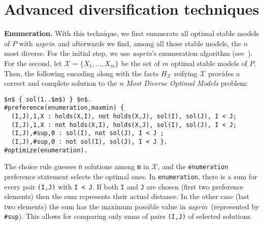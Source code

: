 \documentclass[a4paper,UKenglish]{oasics}
\newcommand{\sysfont}{\textit}
\newcommand{\asprin}{\sysfont{asprin}}
\newcommand{\mysubsection}[2]{\smallskip\noindent\textbf{#1.}}
\begin{document}
%
%
%
%
%
%
%
%
%
%
%
%
%
%
%
%
%
%
%
%
%
%
%
%
%
%
%
%
%
%
%
%
%
%
%
%
%
%
%
%
%
%
%
%
%
%
%
%
%
%
%
%
%
%
%
%
%
%
%
%
%
%
%
%
%
%
%
%
%
%
%
%
%
%
%
%
%
%
%
%
%
%
%
%
%
%
%
%
%
%
%
%
%
%
%
%
%
%
%
%
%
%

\section{Advanced diversification techniques}\label{sec:advanced}
%
\makeatletter{}%

%
%
\mysubsection{Enumeration}{sec:enumeration}
%
With this technique, we first enumerate all optimal stable models of $P$ with \asprin\
and afterwards we find, among all those stable models, the $n$ most diverse.
%
%
%
For the initial step, we use \asprin{}'s enumeration algorithm (see~\cite{brderosc15a}).
For the second, let $\mathcal{X}=\{ X_1, \ldots, X_m \}$ be the set of $m$ optimal stable models of $P$.
Then, the following encoding along with the facts $H_\mathcal{X}$ reifying $\mathcal{X}$ 
provides a correct and complete solution to the \emph{n Most Diverse Optimal Models} problem:
\begin{lstlisting}[mathescape=true,numbers=none]
$n$ { sol(1..$m$) } $n$.
#preference(enumeration,maxmin) { 
  (I,J),1,X : holds(X,I), not holds(X,J), sol(I), sol(J), I < J; 
  (I,J),1,X : not holds(X,I), holds(X,J), sol(I), sol(J), I < J;
  (I,J),#sup,0 : sol(I), not sol(J), I < J ;
  (I,J),#sup,0 : not sol(I), sol(J), I < J }.
#optimize(enumeration).  
\end{lstlisting}
The choice rule guesses \lstinline!n! solutions among \lstinline!m! in $\mathcal{X}$, 
and the \lstinline!enumeration! preference statement selects the optimal ones.
In \lstinline!enumeration!, there is a sum for every pair \lstinline!(I,J)! with \lstinline!I < J!.
If both \lstinline!I! and \lstinline!J! are chosen (first two preference elements) 
then the sum represents their actual distance.
In the other case (last two elements) the sum has the maximum possible value in \asprin\ (represented by \lstinline!#sup!).
This allows for comparing only sums of pairs \lstinline!(I,J)! of selected solutions.
\end{document}
